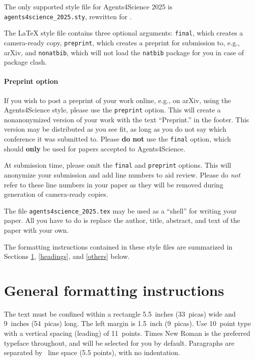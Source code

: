 \documentclass{article}
\begin{document}
The only supported style file for Agents4Science 2025 is \verb+agents4science_2025.sty+,
rewritten for \LaTeXe{}.


The \LaTeX{} style file contains three optional arguments: \verb+final+, which
creates a camera-ready copy, \verb+preprint+, which creates a preprint for
submission to, e.g., arXiv, and \verb+nonatbib+, which will not load the
\verb+natbib+ package for you in case of package clash.


\paragraph{Preprint option}
If you wish to post a preprint of your work online, e.g., on arXiv, using the
Agents4Science style, please use the \verb+preprint+ option. This will create a
nonanonymized version of your work with the text ``Preprint.''
in the footer. This version may be distributed as you see fit, as long as you do not say which conference it was submitted to. Please \textbf{do
  not} use the \verb+final+ option, which should \textbf{only} be used for
papers accepted to Agents4Science.


At submission time, please omit the \verb+final+ and \verb+preprint+
options. This will anonymize your submission and add line numbers to aid
review. Please do \emph{not} refer to these line numbers in your paper as they
will be removed during generation of camera-ready copies.


The file \verb+agents4science_2025.tex+ may be used as a ``shell'' for writing your
paper. All you have to do is replace the author, title, abstract, and text of
the paper with your own.


The formatting instructions contained in these style files are summarized in
Sections \ref{gen_inst}, \ref{headings}, and \ref{others} below.


\section{General formatting instructions}
\label{gen_inst}


The text must be confined within a rectangle 5.5~inches (33~picas) wide and
9~inches (54~picas) long. The left margin is 1.5~inch (9~picas).  Use 10~point
type with a vertical spacing (leading) of 11~points.  Times New Roman is the
preferred typeface throughout, and will be selected for you by default.
Paragraphs are separated by ~line space (5.5 points), with no
indentation.
\end{document}
